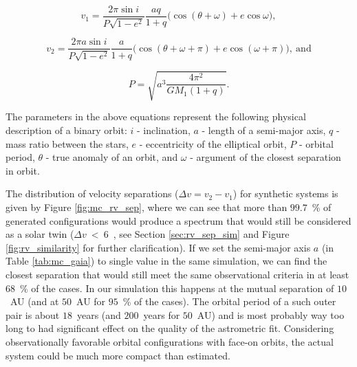 \begin{equation}
	\label{equ:rad_vel1}
	v_{1} = \frac{2 \pi \sin i}{P \sqrt{1 - e^2}} \frac{a q}{1+q} \Big(\cos(\theta + \omega) + e \cos \omega \Big),
\end{equation}

\begin{equation}
	\label{equ:rad_vel2}
	v_{2} = \frac{2 \pi a \sin i}{P \sqrt{1 - e^2}} \frac{a}{1+q} \Big(\cos(\theta + \omega + \pi) + e \cos (\omega  + \pi) \Big),\:\mathrm{and}
\end{equation}

\begin{equation}
	\label{equ:rad_period}
	P = \sqrt{a^3 \frac{4 \pi^2}{G M_1 (1 + q)}}.
\end{equation}

The parameters in the above equations represent the following physical description of a binary orbit: $i$ - inclination, $a$ - length of a semi-major axis, $q$ - mass ratio between the stars, $e$ - eccentricity of the elliptical orbit, $P$ - orbital period, $\theta$ - true anomaly of an orbit, and $\omega$ - argument of the closest separation in orbit.

The distribution of velocity separations ($\Delta v = v_2 - v_1$) for synthetic systems is given by Figure \ref{fig:mc_rv_sep}, where we can see that more than $99.7$~\% of generated configurations would produce a spectrum that would still be considered as a solar twin ($\Delta v$~<~6~\kms, see Section \ref{sec:rv_sep_sim} and Figure \ref{fig:rv_similarity} for further clarification). If we set the semi-major axis $a$ (in Table \ref{tab:mc_gaia}) to single value in the same simulation, we can find the closest separation that would still meet the same observational criteria in at least $68$~\% of the cases. In our simulation this happens at the mutual separation of $10$~AU (and at $50$~AU for $95$~\% of the cases). The orbital period of a such outer pair is about $18$~years (and $200$~years for $50$~AU) and is most probably way too long to had significant effect on the quality of the astrometric fit. Considering observationally favorable orbital configurations with face-on orbits, the actual system could be much more compact than estimated.

